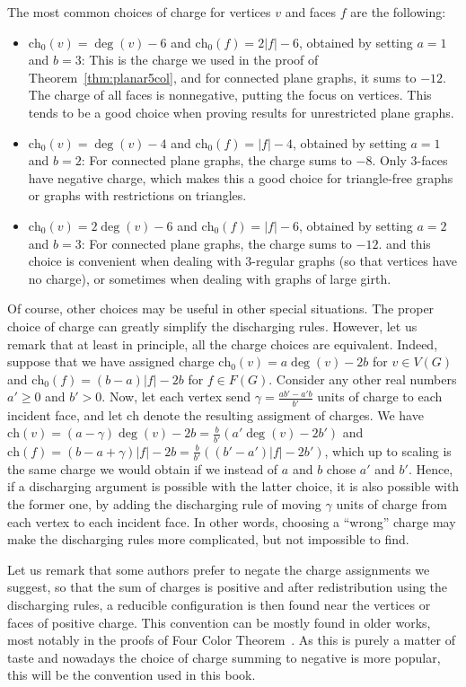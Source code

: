 \documentclass[12pt,twoside,openright,a4paper]{book}
\newcommand{\initch}{\text{ch}_0}
\newcommand{\finch}{\text{ch}}
\begin{document}
The most common choices of charge for vertices $v$ and faces $f$ are the following:
\begin{itemize}
\item $\initch(v)=\deg(v)-6$ and $\initch(f)=2|f|-6$, obtained by setting $a=1$ and $b=3$: This is the charge we used in the proof of Theorem~\ref{thm:planar5col},
and for connected plane graphs, it sums to $-12$.  The charge of all faces is nonnegative, putting the focus on vertices.  This tends to be a good
choice when proving results for unrestricted plane graphs.
\item $\initch(v)=\deg(v)-4$ and $\initch(f)=|f|-4$, obtained by setting $a=1$ and $b=2$: For connected plane graphs, the charge sums to $-8$.
Only $3$-faces have negative charge, which makes this a good choice for triangle-free graphs or graphs with restrictions on triangles.
\item $\initch(v)=2\deg(v)-6$ and $\initch(f)=|f|-6$, obtained by setting $a=2$ and $b=3$: For connected plane graphs, the charge sums to $-12$.
and this choice is convenient when dealing with $3$-regular graphs (so that vertices have no charge), or sometimes when dealing with graphs of large girth.
\end{itemize}
Of course, other choices may be useful in other special situations. The proper
choice of charge can greatly simplify the discharging rules.  However, let us
remark that at least in principle, all the charge choices are equivalent.
Indeed, suppose that we have assigned charge $\initch(v)=a\deg(v)-2b$ for $v\in V(G)$ and $\initch(f)=(b-a)|f|-2b$ for $f\in F(G)$.
Consider any other real numbers $a'\ge 0$ and $b'>0$.
Now, let each vertex send $\gamma=\frac{ab'-a'b}{b'}$ units of charge to each incident face, and let $\finch$ denote the resulting assigment of charges.
We have $\finch(v)=(a-\gamma)\deg(v)-2b=\frac{b}{b'}(a'\deg(v)-2b')$ and $\finch(f)=(b-a+\gamma)|f|-2b=\frac{b}{b'}((b'-a')|f|-2b')$,
which up to scaling is the same charge we would obtain if we instead of $a$ and $b$ chose $a'$ and $b'$.
Hence, if a discharging argument is possible with the latter choice, it is also possible with the former one, by adding the discharging rule of
moving $\gamma$ units of charge from each vertex to each incident face.
In other words, choosing a ``wrong'' charge may make the discharging rules more complicated, but not impossible to find.

Let us remark that some authors prefer to negate the charge assignments we suggest, so that the sum of charges is positive and
after redistribution using the discharging rules, a reducible configuration
is then found near the vertices or faces of positive charge.  This convention can be mostly found
in older works, most notably in the proofs of Four Color Theorem~\cite{AppHak1,rsst}.  As this is purely a matter of taste
and nowadays the choice of charge summing to negative is more popular, this will be the convention used in this book.
\end{document}
